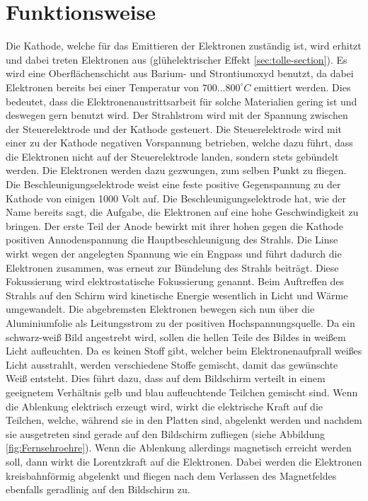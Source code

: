 \section{Funktionsweise}
\label{sec:Funktionsweise}
Die Kathode, welche für das Emittieren der Elektronen zuständig ist, wird erhitzt und dabei treten Elektronen aus (glühelektrischer Effekt \ref{sec:tolle-section}).
Es wird eine Oberflächenschicht aus Barium- und Strontiumoxyd benutzt, da  dabei Elektronen bereits bei einer Temperatur von $700...800 ^\circ C$ emittiert werden.
Dies bedeutet, dass die Elektronenaustrittsarbeit für solche Materialien gering ist und deswegen gern benutzt wird.
Der Strahlstrom wird mit der Spannung zwischen der Steuerelektrode und der Kathode gesteuert.
Die Steuerelektrode wird mit einer zu der Kathode negativen Vorspannung betrieben, welche dazu führt, dass die Elektronen nicht auf der Steuerelektrode landen, sondern stets gebündelt werden.
Die Elektronen werden dazu gezwungen, zum selben Punkt zu fliegen.
Die Beschleunigungselektrode weist eine feste positive Gegenspannung zu der Kathode von einigen 1000 Volt auf. 
Die Beschleunigungselektrode hat, wie der Name bereits sagt, die Aufgabe, die Elektronen auf eine hohe Geschwindigkeit zu bringen.
Der erste Teil der Anode bewirkt mit ihrer hohen gegen die Kathode positiven Annodenspannung die Hauptbeschleunigung des Strahls.
Die Linse wirkt wegen der angelegten Spannung wie ein Engpass und führt dadurch die Elektronen zusammen, was erneut zur Bündelung des Strahls beiträgt.
Diese Fokussierung wird elektrostatische Fokussierung genannt.
Beim Auftreffen des Strahls auf den Schirm wird kinetische Energie wesentlich in Licht und Wärme umgewandelt.
Die abgebremsten Elektronen bewegen sich nun über die Aluminiumfolie als Leitungsstrom zu der positiven Hochspannungsquelle.
Da ein schwarz-weiß Bild angestrebt wird, sollen die hellen Teile des Bildes in weißem Licht aufleuchten.
Da es keinen Stoff gibt, welcher beim Elektronenaufprall weißes Licht ausstrahlt, werden verschiedene Stoffe gemischt, damit das gewünschte Weiß entsteht.
Dies führt dazu, dass auf dem Bildschirm verteilt in einem geeignetem Verhältnis gelb und blau aufleuchtende Teilchen gemischt sind.
Wenn die Ablenkung elektrisch erzeugt wird, wirkt die elektrische Kraft auf die Teilchen, welche, während sie in den Platten sind, abgelenkt werden und nachdem sie ausgetreten sind gerade auf den Bildschirm zufliegen (siehe Abbildung \ref{fig:Fernsehroehre}).
Wenn die Ablenkung allerdings magnetisch erreicht werden soll, dann wirkt die Lorentzkraft auf die Elektronen.
Dabei werden die Elektronen kreisbahnförmig abgelenkt und fliegen nach dem Verlassen des Magnetfeldes ebenfalls geradlinig auf den Bildschirm zu.
